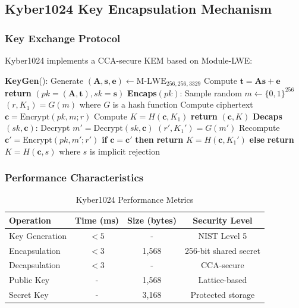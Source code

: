 \documentclass[11pt,a4paper]{article}
\begin{document}
\subsection{Kyber1024 Key Encapsulation Mechanism}

\subsubsection{Key Exchange Protocol}

Kyber1024 implements a CCA-secure KEM based on Module-LWE:

\begin{algorithm}[H]
\caption{Kyber1024 Key Encapsulation}
\begin{algorithmic}
\STATE \textbf{KeyGen}():
\STATE \quad Generate $(\mathbf{A}, \mathbf{s}, \mathbf{e}) \leftarrow \text{M-LWE}_{256,256,3329}$
\STATE \quad Compute $\mathbf{t} = \mathbf{A}\mathbf{s} + \mathbf{e}$
\STATE \quad \textbf{return} $(pk = (\mathbf{A}, \mathbf{t}), sk = \mathbf{s})$
\STATE
\STATE \textbf{Encaps}$(pk)$:
\STATE \quad Sample random $m \leftarrow \{0,1\}^{256}$
\STATE \quad $(r, K_1) = G(m)$ where $G$ is a hash function
\STATE \quad Compute ciphertext $\mathbf{c} = \text{Encrypt}(pk, m; r)$
\STATE \quad Compute $K = H(\mathbf{c}, K_1)$
\STATE \quad \textbf{return} $(\mathbf{c}, K)$
\STATE
\STATE \textbf{Decaps}$(sk, \mathbf{c})$:
\STATE \quad Decrypt $m' = \text{Decrypt}(sk, \mathbf{c})$
\STATE \quad $(r', K_1') = G(m')$
\STATE \quad Recompute $\mathbf{c}' = \text{Encrypt}(pk, m'; r')$
\STATE \quad \textbf{if} $\mathbf{c} = \mathbf{c}'$ \textbf{then} \textbf{return} $K = H(\mathbf{c}, K_1')$
\STATE \quad \textbf{else} \textbf{return} $K = H(\mathbf{c}, s)$ where $s$ is implicit rejection
\end{algorithmic}
\end{algorithm}

\subsubsection{Performance Characteristics}

\begin{table}[H]
\centering
\caption{Kyber1024 Performance Metrics}
\begin{tabular}{|l|c|c|c|}
\hline
\textbf{Operation} & \textbf{Time (ms)} & \textbf{Size (bytes)} & \textbf{Security Level} \\
\hline
Key Generation & $<5$ & - & NIST Level 5 \\
Encapsulation & $<3$ & 1,568 & 256-bit shared secret \\
Decapsulation & $<3$ & - & CCA-secure \\
Public Key & - & 1,568 & Lattice-based \\
Secret Key & - & 3,168 & Protected storage \\
\hline
\end{tabular}
\label{tab:kyber-performance}
\end{table}
\end{document}

